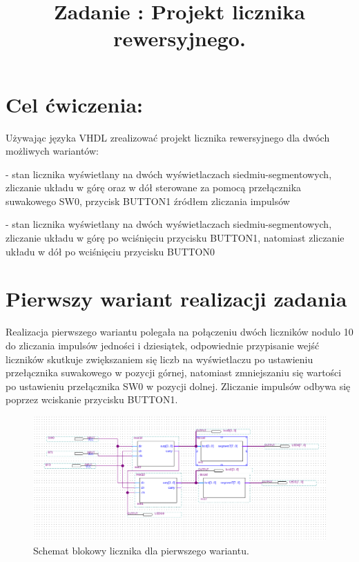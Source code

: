 \documentclass{classrep}
\author{
  \studentinfo{Witold Olechowski}{127517} \and
  \studentinfo{Tomasz Marecik}{127374}
}
\title{Zadanie : Projekt licznika rewersyjnego.}
\begin{document}
\maketitle

\section{Cel ćwiczenia:}
Używając języka VHDL zrealizować projekt licznika rewersyjnego dla dwóch możliwych wariantów: 

- stan licznika wyświetlany na dwóch wyświetlaczach siedmiu-segmentowych, zliczanie układu w górę
oraz w dół sterowane za pomocą przełącznika suwakowego SW0, przycisk BUTTON1 źródłem
zliczania impulsów

- stan licznika wyświetlany na dwóch wyświetlaczach siedmiu-segmentowych, zliczanie układu w górę
po wciśnięciu przycisku BUTTON1, natomiast zliczanie układu w dół po wciśnięciu przycisku BUTTON0


\section{Pierwszy wariant realizacji zadania}
\label{sec:pierw} %
Realizacja pierwszego wariantu polegała na połączeniu dwóch liczników nodulo 10 do zliczania
impulsów jedności i dziesiątek, odpowiednie przypisanie wejść liczników skutkuje zwiększaniem się
liczb na wyświetlaczu po ustawieniu przełącznika suwakowego w pozycji górnej, natomiast
zmniejszaniu się wartości po ustawieniu przełącznika SW0 w pozycji dolnej. Zliczanie impulsów
odbywa się poprzez wciskanie przycisku BUTTON1.

\begin{figure}[H]  %
	\centering
	\includegraphics[width=1.0\linewidth]{blok.png}  %
	\caption{ Schemat blokowy licznika dla pierwszego wariantu. }
	\label{fig:block_bcd_segment}
\end{figure}
\end{document}
